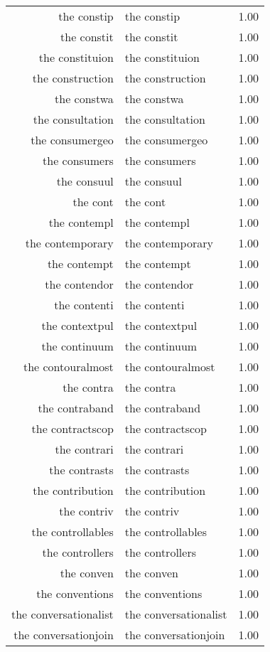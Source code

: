 \begin{table}[ht]
\begin{tabular}{rlr}
  the constip & the constip & 1.00 \\ 
  the constit & the constit & 1.00 \\ 
  the constituion & the constituion & 1.00 \\ 
  the construction & the construction & 1.00 \\ 
  the constwa & the constwa & 1.00 \\ 
  the consultation & the consultation & 1.00 \\ 
  the consumergeo & the consumergeo & 1.00 \\ 
  the consumers & the consumers & 1.00 \\ 
  the consuul & the consuul & 1.00 \\ 
  the cont & the cont & 1.00 \\ 
  the contempl & the contempl & 1.00 \\ 
  the contemporary & the contemporary & 1.00 \\ 
  the contempt & the contempt & 1.00 \\ 
  the contendor & the contendor & 1.00 \\ 
  the contenti & the contenti & 1.00 \\ 
  the contextpul & the contextpul & 1.00 \\ 
  the continuum & the continuum & 1.00 \\ 
  the contouralmost & the contouralmost & 1.00 \\ 
  the contra & the contra & 1.00 \\ 
  the contraband & the contraband & 1.00 \\ 
  the contractscop & the contractscop & 1.00 \\ 
  the contrari & the contrari & 1.00 \\ 
  the contrasts & the contrasts & 1.00 \\ 
  the contribution & the contribution & 1.00 \\ 
  the contriv & the contriv & 1.00 \\ 
  the controllables & the controllables & 1.00 \\ 
  the controllers & the controllers & 1.00 \\ 
  the conven & the conven & 1.00 \\ 
  the conventions & the conventions & 1.00 \\ 
  the conversationalist & the conversationalist & 1.00 \\ 
  the conversationjoin & the conversationjoin & 1.00 \\ 

\end{tabular}
\end{table}
